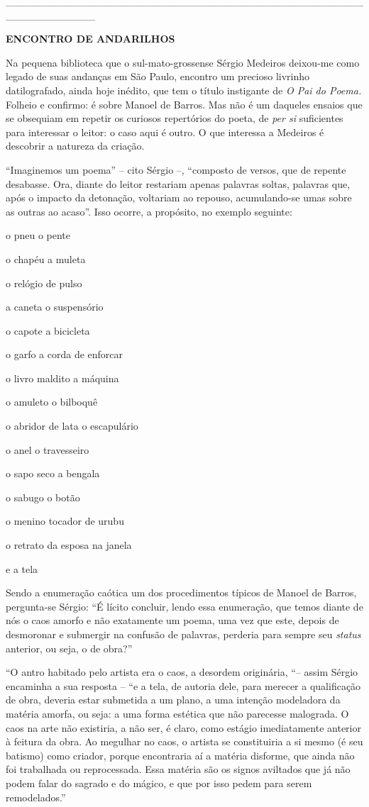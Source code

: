 \_\_\_\_\_\_\_\_\_\_\_\_\_\_\_\_\_\_\_\_\_\_\_\_\_\_\_\_\_\_\_\_\_\_\_\_\_\_\_\_\_\_\_\_\_\_\_\_\_\_\_\_\_\_\_\_\_\_\_\_

\textbf{ENCONTRO DE ANDARILHOS}

Na pequena biblioteca que o sul-mato-grossense Sérgio Medeiros deixou-me
como legado de suas andanças em São Paulo, encontro um precioso livrinho
datilografado, ainda hoje inédito, que tem o título instigante de
\emph{O Pai do Poema.} Folheio e confirmo: é sobre Manoel de Barros. Mas
não é um daqueles ensaios que se obsequiam em repetir os curiosos
repertórios do poeta, de \emph{per si} suficientes para interessar o
leitor: o caso aqui é outro. O que interessa a Medeiros é descobrir a
natureza da criação.

``Imaginemos um poema'' -- cito Sérgio --, ``composto de versos, que de
repente desabasse. Ora, diante do leitor restariam apenas palavras
soltas, palavras que, após o impacto da detonação, voltariam ao repouso,
acumulando-se umas sobre as outras ao acaso''. Isso ocorre, a propósito,
no exemplo seguinte:

o pneu o pente

o chapéu a muleta

o relógio de pulso

a caneta o suspensório

o capote a bicicleta

o garfo a corda de enforcar

o livro maldito a máquina

o amuleto o bilboquê

o abridor de lata o escapulário

o anel o travesseiro

o sapo seco a bengala

o sabugo o botão

o menino tocador de urubu

o retrato da esposa na janela

e a tela

Sendo a enumeração caótica um dos procedimentos típicos de Manoel de
Barros, pergunta-se Sérgio: ``É lícito concluir, lendo essa enumeração,
que temos diante de nós o caos amorfo e não exatamente um poema, uma vez
que este, depois de desmoronar e submergir na confusão de palavras,
perderia para sempre seu \emph{status} { } anterior, ou seja, o de
obra?''

``O antro habitado pelo artista era o caos, a desordem originária, ``--
assim Sérgio encaminha a sua resposta -- ``e a tela, de autoria dele,
para merecer a qualificação de obra, deveria estar submetida a um plano,
a uma intenção modeladora da matéria amorfa, ou seja: a uma forma
estética que não parecesse malograda. O caos na arte não existiria, a
não ser, é claro, como estágio imediatamente anterior à feitura da obra.
Ao megulhar no caos, o artista se constituiria a si mesmo (é seu
batismo) como criador, porque encontraria aí a matéria disforme, que
ainda não foi trabalhada ou reprocessada. Essa matéria são os signos
aviltados que já não podem falar do sagrado e do mágico, e que por isso
pedem para serem remodelados.''

